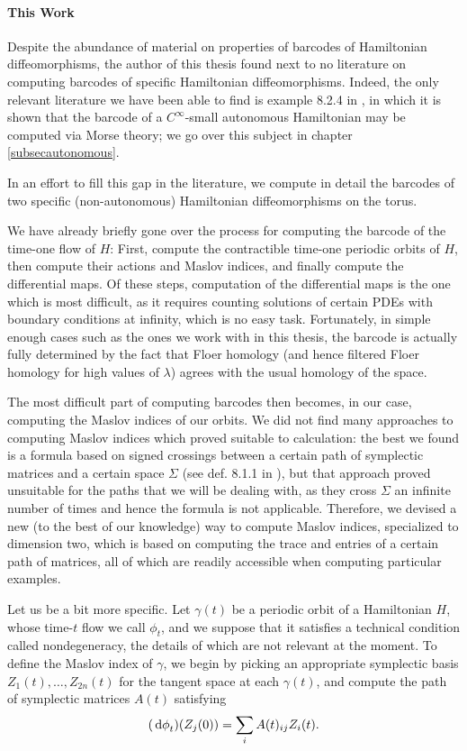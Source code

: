 \paragraph{This Work}

Despite the abundance of material on properties of barcodes of Hamiltonian diffeomorphisms, the author of this thesis found next to no literature on computing barcodes of specific Hamiltonian diffeomorphisms. Indeed, the only relevant literature we have been able to find is example 8.2.4 in \cite{polterovich}, in which it is shown that the barcode of a $C^\infty$-small autonomous Hamiltonian may be computed via Morse theory; we go over this subject in chapter \ref{subsecautonomous}.

In an effort to fill this gap in the literature, we compute in detail the barcodes of two specific (non-autonomous) Hamiltonian diffeomorphisms on the torus.

We have already briefly gone over the process for computing the barcode of the time-one flow of $H$: First, compute the contractible time-one periodic orbits of $H$, then compute their actions and Maslov indices, and finally compute the differential maps. Of these steps, computation of the differential maps is the one which is most difficult, as it requires counting solutions of certain PDEs with boundary conditions at infinity, which is no easy task. Fortunately, in simple enough cases such as the ones we work with in this thesis, the barcode is actually fully determined by the fact that Floer homology (and hence filtered Floer homology for high values of $\lambda$) agrees with the usual homology of the space.

The most difficult part of computing barcodes then becomes, in our case, computing the Maslov indices of our orbits. We did not find many approaches to computing Maslov indices which proved suitable to calculation: the best we found is a formula based on signed crossings between a certain path of symplectic matrices and a certain space $\Sigma$ (see def. 8.1.1 in \cite{polterovich}), but that approach proved unsuitable for the paths that we will be dealing with, as they cross $\Sigma$ an infinite number of times and hence the formula is not applicable. Therefore, we devised a new (to the best of our knowledge) way to compute Maslov indices, specialized to dimension two, which is based on computing the trace and entries of a certain path of matrices, all of which are readily accessible when computing particular examples.

Let us be a bit more specific. Let $\gamma(t)$ be a periodic orbit of a Hamiltonian $H$, whose time-$t$ flow we call $\phi_t$, and we suppose that it satisfies a technical condition called nondegeneracy, the details of which are not relevant at the moment. To define the Maslov index of $\gamma$, we begin by picking an appropriate symplectic basis $Z_1(t), \dots, Z_{2n}(t)$ for the tangent space at each $\gamma(t)$, and compute the path of symplectic matrices $A(t)$ satisfying
\begin{equation}
(\dl \phi_t)(Z_j(0)) = \sum_i A(t)_{ij} Z_i(t).
\end{equation}

